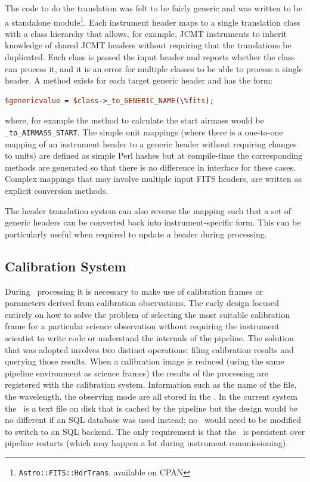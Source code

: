 \documentclass[final,authoryear,5p,times,twocolumn]{elsarticle}
\begin{document}
The code to do the translation was felt to be fairly generic and was
written to be a standalone
module\footnote{\texttt{Astro::FITS::HdrTrans}, available on
  CPAN}. Each instrument header maps to a single translation class
with a class hierarchy that allows, for example, JCMT instruments to
inherit knowledge of shared JCMT headers without requiring that the
translations be duplicated. Each class is passed the input header and
reports whether the class can process it, and it is an error for multiple
classes to be able to process a single header. A method exists for each
target generic header and has the form:

\begin{lstlisting}[language=perl]
$genericvalue = $class->_to_GENERIC_NAME(\%fits);
\end{lstlisting}

where, for example the method to calculate the start airmass would be
\texttt{\_to\_AIRMASS\_START}. The simple unit mappings (where there
is a one-to-one mapping of an instrument header to a generic header
without requiring changes to units) are defined as simple Perl hashes
but at compile-time the corresponding methods are generated so that
there is no difference in interface for these cases. Complex mappings
that may involve multiple input FITS headers, are written as explicit
conversion methods.

The header translation system can also reverse the mapping such that a
set of generic headers can be converted back into instrument-specific
form. This can be particularly useful when required to update a header
during processing.

\subsection{Calibration System}

During \Frame\ processing it is necessary to make use of calibration
frames or parameters derived from calibration observations. The early
design focused entirely on how to solve the problem of selecting the
most suitable calibration frame for a particular science observation
without requiring the instrument scientist to write code or understand
the internals of the pipeline. The solution that was adopted involves
two distinct operations: filing calibration results and querying those results.
When a calibration image is reduced (using the same pipeline
environment as science frames) the results of the processing are
registered with the calibration system. Information such as the name
of the file, the wavelength, the observing mode are all stored in the \Index.
In the current system the \Index\ is a text file on disk that is cached by
the pipeline but the design would be no different if an SQL database
was used instead; no \primitives\ would need to be modified to switch
to an SQL backend.  The only requirement is that the \Index\ is
persistent over pipeline restarts (which may happen a lot during
instrument commissioning).
\end{document}
